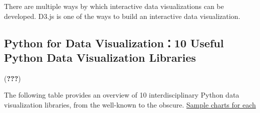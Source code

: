 \documentclass[]{book}
\begin{document}
There are multiple ways by which interactive data visualizations can be
developed. D3.js is one of the ways to build an interactive data
visualization.

\subsection{Python for Data Visualization：10 Useful Python Data
Visualization
Libraries}\label{python-for-data-visualization10-useful-python-data-visualization-libraries}

({\textbf{???}})

The following table provides an overview of 10 interdisciplinary Python
data visualization libraries, from the well-known to the obscure.
\href{https://blog.modeanalytics.com/python-data-visualization-libraries/}{Sample
charts for each}
\end{document}
